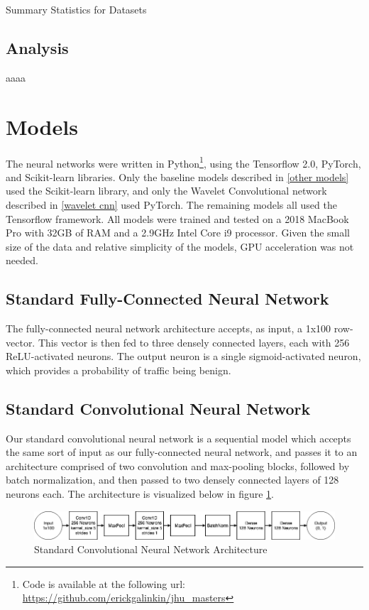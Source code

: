 \documentclass[10pt]{article}
\begin{document}
\begin{table}[ht]
\caption{Summary Statistics for Datasets}
\centering
\label{Tab:summary}	
\end{table}


\subsection{Analysis}
aaaa

\section{Models}
The neural networks were written in Python\footnote{Code is available at the following url: \url{https://github.com/erickgalinkin/jhu_masters}}, using the Tensorflow 2.0, PyTorch, and Scikit-learn libraries.
Only the baseline models described in \ref{other models} used the Scikit-learn library, and only the Wavelet Convolutional network described in \ref{wavelet cnn} used PyTorch.
The remaining models all used the Tensorflow framework.
All models were trained and tested on a 2018 MacBook Pro with 32GB of RAM and a 2.9GHz Intel Core i9 processor.
Given the small size of the data and relative simplicity of the models, GPU acceleration was not needed.

\subsection{Standard Fully-Connected Neural Network}
The fully-connected neural network architecture accepts, as input, a 1x100 row-vector. 
This vector is then fed to three densely connected layers, each with 256 ReLU-activated neurons.
The output neuron is a single sigmoid-activated neuron, which provides a probability of traffic being benign.

\subsection{Standard Convolutional Neural Network}
Our standard convolutional neural network is a sequential model which accepts the same sort of input as our fully-connected neural network, and passes it to an architecture comprised of two convolution and max-pooling blocks, followed by batch normalization, and then passed to two densely connected layers of 128 neurons each. The architecture is visualized below in figure \ref{fig:conv net}.

\begin{figure}[h]
\caption{Standard Convolutional Neural Network Architecture}
\label{fig:conv net}
\includegraphics[width=\textwidth]{conv_architecture}
\centering
\end{figure}
\end{document}

